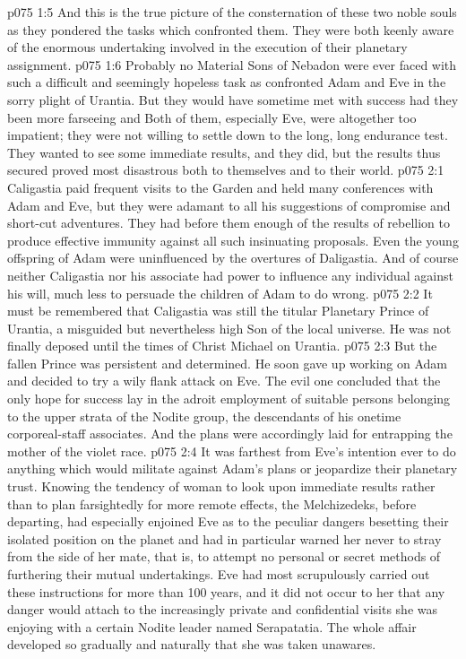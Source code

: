 \vs p075 1:5 And this is the true picture of the consternation of these two noble souls as they pondered the tasks which confronted them. They were both keenly aware of the enormous undertaking involved in the execution of their planetary assignment.
\vs p075 1:6 Probably no Material Sons of Nebadon were ever faced with such a difficult and seemingly hopeless task as confronted Adam and Eve in the sorry plight of Urantia. But they would have sometime met with success had they been more farseeing and  Both of them, especially Eve, were altogether too impatient; they were not willing to settle down to the long, long endurance test. They wanted to see some immediate results, and they did, but the results thus secured proved most disastrous both to themselves and to their world.
\vs p075 2:1 Caligastia paid frequent visits to the Garden and held many conferences with Adam and Eve, but they were adamant to all his suggestions of compromise and short\hyp{}cut adventures. They had before them enough of the results of rebellion to produce effective immunity against all such insinuating proposals. Even the young offspring of Adam were uninfluenced by the overtures of Daligastia. And of course neither Caligastia nor his associate had power to influence any individual against his will, much less to persuade the children of Adam to do wrong.
\vs p075 2:2 It must be remembered that Caligastia was still the titular Planetary Prince of Urantia, a misguided but nevertheless high Son of the local universe. He was not finally deposed until the times of Christ Michael on Urantia.
\vs p075 2:3 But the fallen Prince was persistent and determined. He soon gave up working on Adam and decided to try a wily flank attack on Eve. The evil one concluded that the only hope for success lay in the adroit employment of suitable persons belonging to the upper strata of the Nodite group, the descendants of his onetime corporeal\hyp{}staff associates. And the plans were accordingly laid for entrapping the mother of the violet race.
\vs p075 2:4 \pc It was farthest from Eve’s intention ever to do anything which would militate against Adam’s plans or jeopardize their planetary trust. Knowing the tendency of woman to look upon immediate results rather than to plan farsightedly for more remote effects, the Melchizedeks, before departing, had especially enjoined Eve as to the peculiar dangers besetting their isolated position on the planet and had in particular warned her never to stray from the side of her mate, that is, to attempt no personal or secret methods of furthering their mutual undertakings. Eve had most scrupulously carried out these instructions for more than 100 years, and it did not occur to her that any danger would attach to the increasingly private and confidential visits she was enjoying with a certain Nodite leader named Serapatatia. The whole affair developed so gradually and naturally that she was taken unawares.
